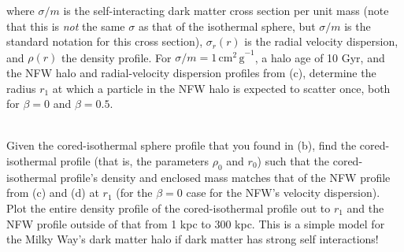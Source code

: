 \documentclass[12pt]{article}
\begin{document}
where $\sigma/m$ is the self-interacting dark matter cross section per
unit mass (note that this is \emph{not} the same $\sigma$ as that of
the isothermal sphere, but $\sigma/m$ is the standard notation for
this cross section), $\sigma_r(r)$ is the radial velocity dispersion,
and $\rho(r)$ the density profile. For $\sigma/m =
1\,\mathrm{cm^2\,g}^{-1}$, a halo age of 10 Gyr, and the NFW halo and
radial-velocity dispersion profiles from (c), determine the radius
$r_1$ at which a particle in the NFW halo is expected to scatter once,
both for $\beta=0$ and $\beta=0.5$.\\\

 Given the cored-isothermal sphere profile that you
found in (b), find the cored-isothermal profile (that is, the
parameters $\rho_0$ and $r_0$) such that the cored-isothermal
profile's density and enclosed mass matches that of the NFW profile
from (c) and (d) at $r_1$ (for the $\beta=0$ case for the NFW's
velocity dispersion). Plot the entire density profile of the
cored-isothermal profile out to $r_1$ and the NFW profile outside of
that from 1 kpc to 300 kpc. This is a simple model for the Milky Way's
dark matter halo if dark matter has strong self interactions!
\end{document}
